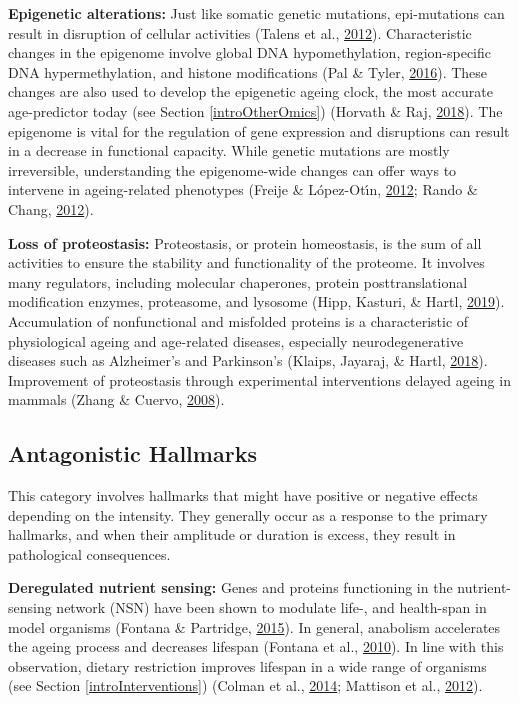 \documentclass[12pt,twoside]{unicam}
\begin{document}
\textbf{Epigenetic alterations:} Just like somatic genetic mutations, epi-mutations can result in disruption of cellular activities (Talens et al., \protect\hyperlink{ref-Talens2012}{2012}). Characteristic changes in the epigenome involve global DNA hypomethylation, region-specific DNA hypermethylation, and histone modifications (Pal \& Tyler, \protect\hyperlink{ref-Pal2016}{2016}). These changes are also used to develop the epigenetic ageing clock, the most accurate age-predictor today (see Section \ref{introOtherOmics}) (Horvath \& Raj, \protect\hyperlink{ref-Horvath2018}{2018}). The epigenome is vital for the regulation of gene expression and disruptions can result in a decrease in functional capacity. While genetic mutations are mostly irreversible, understanding the epigenome-wide changes can offer ways to intervene in ageing-related phenotypes (Freije \& López-Otı́n, \protect\hyperlink{ref-Freije2012}{2012}; Rando \& Chang, \protect\hyperlink{ref-Rando2012}{2012}).

\textbf{Loss of proteostasis:} Proteostasis, or protein homeostasis, is the sum of all activities to ensure the stability and functionality of the proteome. It involves many regulators, including molecular chaperones, protein posttranslational modification enzymes, proteasome, and lysosome (Hipp, Kasturi, \& Hartl, \protect\hyperlink{ref-Hipp2019}{2019}). Accumulation of nonfunctional and misfolded proteins is a characteristic of physiological ageing and age-related diseases, especially neurodegenerative diseases such as Alzheimer's and Parkinson's (Klaips, Jayaraj, \& Hartl, \protect\hyperlink{ref-Klaips2018}{2018}). Improvement of proteostasis through experimental interventions delayed ageing in mammals (Zhang \& Cuervo, \protect\hyperlink{ref-Zhang2008}{2008}).

\hypertarget{antagonistic-hallmarks}{%
\subsection{Antagonistic Hallmarks}\label{antagonistic-hallmarks}}

This category involves hallmarks that might have positive or negative effects depending on the intensity. They generally occur as a response to the primary hallmarks, and when their amplitude or duration is excess, they result in pathological consequences.

\textbf{Deregulated nutrient sensing:} Genes and proteins functioning in the nutrient-sensing network (NSN) have been shown to modulate life-, and health-span in model organisms (Fontana \& Partridge, \protect\hyperlink{ref-Fontana2015}{2015}). In general, anabolism accelerates the ageing process and decreases lifespan (Fontana et al., \protect\hyperlink{ref-Fontana2010}{2010}). In line with this observation, dietary restriction improves lifespan in a wide range of organisms (see Section \ref{introInterventions}) (Colman et al., \protect\hyperlink{ref-Colman2014}{2014}; Mattison et al., \protect\hyperlink{ref-Mattison2012}{2012}).
\end{document}
